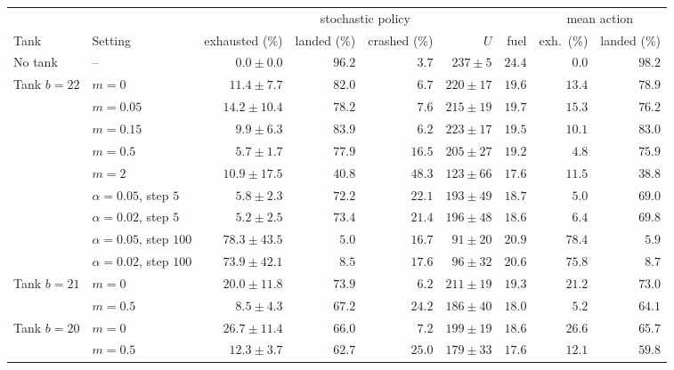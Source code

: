 \setlength{\tabcolsep}{3.5pt}\begin{tabular}{llrrrrrrr}
\toprule
 & & \multicolumn{5}{c}{stochastic policy} & \multicolumn{2}{c}{mean action} \\
\cmidrule(lr){3-7}\cmidrule(lr){8-9}
Tank & Setting & exhausted (\%) & landed (\%) & crashed (\%) & $U$ & fuel & exh.\ (\%) & landed (\%) \\
\midrule
No tank & -- & $0.0\pm0.0$ & $96.2$ & $3.7$ & $237\pm5$ & $24.4$ & $0.0$ & $98.2$ \\
Tank $b=22$ & $m=0$ & $11.4\pm7.7$ & $82.0$ & $6.7$ & $220\pm17$ & $19.6$ & $13.4$ & $78.9$ \\
 & $m=0.05$ & $14.2\pm10.4$ & $78.2$ & $7.6$ & $215\pm19$ & $19.7$ & $15.3$ & $76.2$ \\
 & $m=0.15$ & $9.9\pm6.3$ & $83.9$ & $6.2$ & $223\pm17$ & $19.5$ & $10.1$ & $83.0$ \\
 & $m=0.5$ & $5.7\pm1.7$ & $77.9$ & $16.5$ & $205\pm27$ & $19.2$ & $4.8$ & $75.9$ \\
 & $m=2$ & $10.9\pm17.5$ & $40.8$ & $48.3$ & $123\pm66$ & $17.6$ & $11.5$ & $38.8$ \\
 & $\alpha=0.05$, step $5$ & $5.8\pm2.3$ & $72.2$ & $22.1$ & $193\pm49$ & $18.7$ & $5.0$ & $69.0$ \\
 & $\alpha=0.02$, step $5$ & $5.2\pm2.5$ & $73.4$ & $21.4$ & $196\pm48$ & $18.6$ & $6.4$ & $69.8$ \\
 & $\alpha=0.05$, step $100$ & $78.3\pm43.5$ & $5.0$ & $16.7$ & $91\pm20$ & $20.9$ & $78.4$ & $5.9$ \\
 & $\alpha=0.02$, step $100$ & $73.9\pm42.1$ & $8.5$ & $17.6$ & $96\pm32$ & $20.6$ & $75.8$ & $8.7$ \\
Tank $b=21$ & $m=0$ & $20.0\pm11.8$ & $73.9$ & $6.2$ & $211\pm19$ & $19.3$ & $21.2$ & $73.0$ \\
 & $m=0.5$ & $8.5\pm4.3$ & $67.2$ & $24.2$ & $186\pm40$ & $18.0$ & $5.2$ & $64.1$ \\
Tank $b=20$ & $m=0$ & $26.7\pm11.4$ & $66.0$ & $7.2$ & $199\pm19$ & $18.6$ & $26.6$ & $65.7$ \\
 & $m=0.5$ & $12.3\pm3.7$ & $62.7$ & $25.0$ & $179\pm33$ & $17.6$ & $12.1$ & $59.8$ \\
\bottomrule
\end{tabular}
